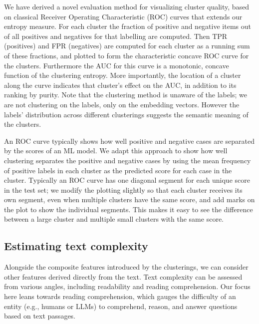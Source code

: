 We have derived a novel evaluation method for visualizing cluster quality, based on classical Receiver Operating Characteristic (ROC) curves that extends our entropy measure. For each cluster the fraction of positive and negative items out of all positives and negatives for that labelling are computed.  Then TPR (positives) and FPR (negatives) are computed for each cluster as a running sum of these fractions, and plotted to form the characteristic concave ROC curve for the clusters. Furthermore the AUC for this curve is a monotonic, concave function of the clustering entropy. More importantly, the location of a cluster along the curve indicates that cluster's effect on the AUC, in addition to its ranking by purity.  Note that the clustering method is unaware of the labels; we are not clustering on the labels, only on the embedding vectors.  However the labels' distribution across different clusterings suggests the semantic meaning of the clusters. 

An ROC curve typically shows how well positive and negative cases are separated by the scores of an ML model. We adapt this approach to show how well clustering separates the positive and negative cases by using the mean frequency of positive labels in each cluster as the predicted score for each case in the cluster. Typically an ROC curve has one diagonal segment for each unique score in the test set; we modify the plotting slightly so that each cluster receives its own segment, even when multiple clusters have the same score, and add marks on the plot to show the individual segments. This makes it easy to see the difference between a large cluster and multiple small clusters with the same score.


\subsection{Estimating text complexity}

Alongside the composite features introduced by the clusterings, we can consider other features derived directly from the text. Text complexity can be assessed from various angles, including readability and reading comprehension. Our focus here leans towards reading comprehension, which gauges the difficulty of an entity (e.g., humans or LLMs) to comprehend, reason, and answer questions based on text passages.


